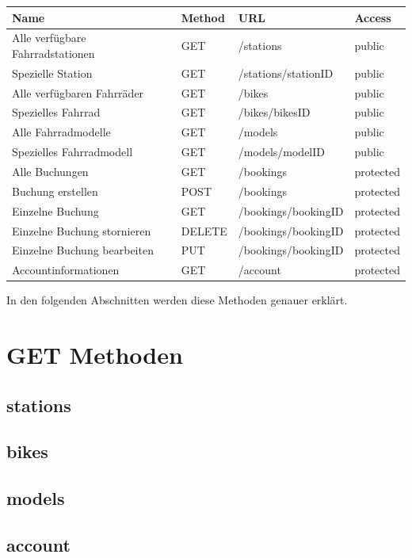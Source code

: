 \begin{tabularx}{\columnwidth}{|X|p{1.5cm}|X|p{1.5cm}|}
	\hline
	Name & Method & URL & Access \\
	\hline
	\hline
	Alle verfügbare Fahrradstationen & GET & /stations & public \\
	\hline
	Spezielle Station & GET & /stations/stationID & public \\
	\hline
	Alle verfügbaren Fahrräder & GET & /bikes & public \\
	\hline
	Spezielles Fahrrad & GET & /bikes/bikesID & public \\
	\hline
	Alle Fahrradmodelle & GET & /models & public \\
	\hline
	Spezielles Fahrradmodell & GET & /models/modelID & public \\
	\hline
	Alle Buchungen & GET & /bookings & protected \\
	\hline
	Buchung erstellen & POST & /bookings & protected \\
	\hline
	Einzelne Buchung & GET & /bookings/bookingID & protected \\
	\hline
	Einzelne Buchung stornieren & DELETE & /bookings/bookingID & protected \\
	\hline
	Einzelne Buchung bearbeiten & PUT & /bookings/bookingID & protected \\
	\hline
	Accountinformationen & GET & /account & protected \\
	\hline
\end{tabularx}

In den folgenden Abschnitten werden diese Methoden genauer erklärt.

\section{GET Methoden}
\subsection{stations}

\subsection{bikes}

\subsection{models}

\subsection{account}

